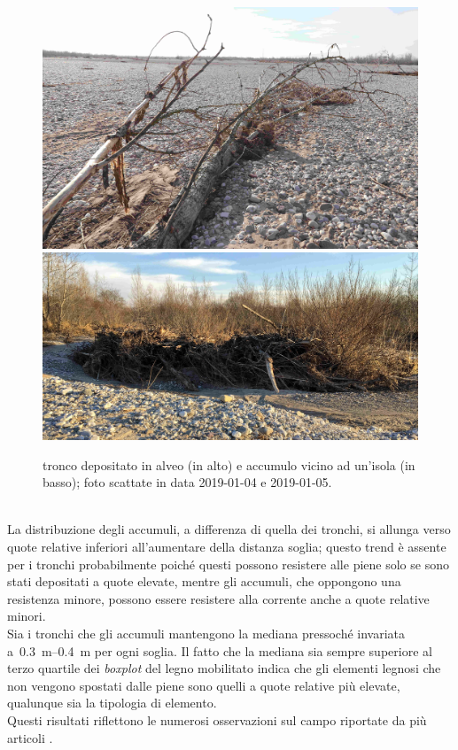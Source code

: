 \begin{figure}
	\centering
	\includegraphics[width = \textwidth]{files/tronco.jpeg}
	\\[0.1cm]
	\includegraphics[width = \textwidth]{files/accumulo.jpeg}
	\caption[tronco depositato in alveo e accumulo vicino ad un'isola]{tronco depositato in alveo (in alto) e accumulo vicino ad un'isola (in basso); foto scattate in data 2019-01-04 e 2019-01-05.}
	\label{fig:tronco-vs-accumulo}
\end{figure}
%
\\
La distribuzione degli accumuli, a differenza di quella dei tronchi, si allunga verso quote relative inferiori all'aumentare della distanza soglia; questo trend è assente per i tronchi probabilmente poiché questi possono resistere alle piene solo se sono stati depositati a quote elevate, mentre gli accumuli, che oppongono una resistenza minore, possono essere resistere alla corrente anche a quote relative minori.
\\
Sia i tronchi che gli accumuli mantengono la mediana pressoché invariata a~\SIrange[range-phrase = {-}, range-units = single]{0.3}{0.4}{\m} per ogni soglia.
Il fatto che la mediana sia sempre superiore al terzo quartile dei \emph{boxplot} del legno mobilitato indica che gli elementi legnosi che non vengono spostati dalle piene sono quelli a quote relative più elevate, qualunque sia la tipologia di elemento.
\\
Questi risultati riflettono le numerosi osservazioni sul campo riportate da più articoli .

